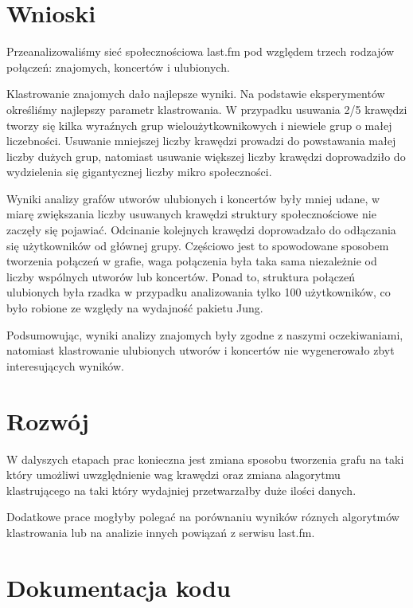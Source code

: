 \documentclass[10pt,a4paper]{article}
\begin{document}
\section{Wnioski}
Przeanalizowaliśmy sieć społecznościowa last.fm pod względem trzech
rodzajów połączeń: znajomych, koncertów i ulubionych.

Klastrowanie znajomych dało najlepsze wyniki. Na podstawie
eksperymentów określiśmy najlepszy parametr klastrowania. W przypadku
usuwania 2/5 krawędzi tworzy się kilka wyraźnych grup
wieloużytkownikowych i niewiele grup o małej liczebności. Usuwanie
mniejszej liczby krawędzi prowadzi do powstawania małej liczby dużych
grup, natomiast usuwanie większej liczby krawędzi doprowadziło do
wydzielenia się gigantycznej liczby mikro społeczności.

Wyniki analizy grafów utworów ulubionych i koncertów były mniej udane,
w miarę zwiększania liczby usuwanych krawędzi struktury
społecznościowe nie zaczęły się pojawiać. Odcinanie kolejnych krawędzi
doprowadzało do odłączania się użytkowników od głównej grupy.
Częściowo jest to spowodowane sposobem tworzenia połączeń w grafie,
waga połączenia była taka sama niezależnie od liczby wspólnych utworów
lub koncertów. Ponad to, struktura połączeń ulubionych była rzadka w
przypadku analizowania tylko 100 użytkowników, co było robione ze
względy na wydajność pakietu Jung.

Podsumowując, wyniki analizy znajomych były zgodne z naszymi
oczekiwaniami, natomiast klastrowanie ulubionych utworów i koncertów
nie wygenerowało zbyt interesujących wyników.

\section{Rozwój}

W dalyszych etapach prac konieczna jest zmiana sposobu tworzenia grafu
na taki który umożliwi uwzględnienie wag krawędzi oraz zmiana
alagorytmu klastrującego na taki który wydajniej przetwarzałby duże
ilości danych.

Dodatkowe prace mogłyby polegać na porównaniu wyników róznych
algorytmów klastrowania lub na analizie innych powiązań z serwisu
last.fm.


\section {Dokumentacja kodu}
\end{document}
